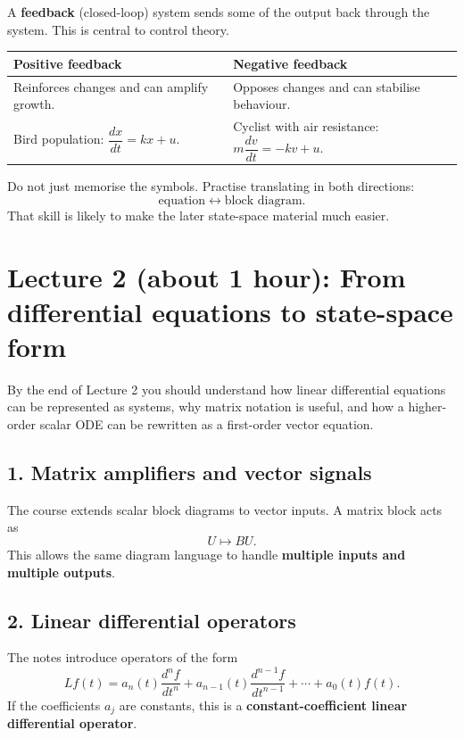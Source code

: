 \documentclass[11pt,a4paper]{article}
\begin{document}
A \textbf{feedback} (closed-loop) system sends some of the output back through the system. This is central to control theory.

\begin{center}
\begin{tabular}{p{6cm}p{6cm}}
\toprule
\textbf{Positive feedback} & \textbf{Negative feedback} \\
\midrule
Reinforces changes and can amplify growth. & Opposes changes and can stabilise behaviour. \\
Bird population: $\dfrac{dx}{dt}=kx+u$. & Cyclist with air resistance: $m\dfrac{dv}{dt}=-kv+u$. \\
\bottomrule
\end{tabular}
\end{center}

\begin{warnbox}
Do not just memorise the symbols. Practise translating in both directions:
\[
\text{equation} \leftrightarrow \text{block diagram}.
\]
That skill is likely to make the later state-space material much easier.
\end{warnbox}

\newpage
\section*{Lecture 2 (about 1 hour): From differential equations to state-space form}

\begin{goalbox}
By the end of Lecture 2 you should understand how linear differential equations can be represented as systems, why matrix notation is useful, and how a higher-order scalar ODE can be rewritten as a first-order vector equation.
\end{goalbox}

\subsection*{1. Matrix amplifiers and vector signals}
The course extends scalar block diagrams to vector inputs. A matrix block acts as
\[
U\mapsto BU.
\]
This allows the same diagram language to handle \textbf{multiple inputs and multiple outputs}.

\subsection*{2. Linear differential operators}
The notes introduce operators of the form
\[
Lf(t)=a_n(t)\frac{d^nf}{dt^n}+a_{n-1}(t)\frac{d^{n-1}f}{dt^{n-1}}+\cdots+a_0(t)f(t).
\]
If the coefficients $a_j$ are constants, this is a \textbf{constant-coefficient linear differential operator}.
\end{document}
